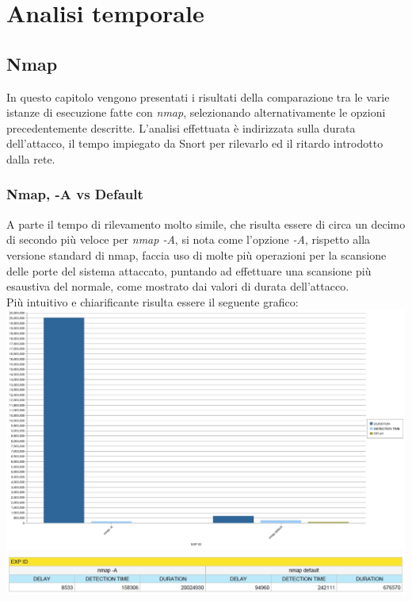 \chapter{Analisi temporale}

\section{Nmap}
In questo capitolo vengono presentati i risultati della comparazione tra le varie istanze di esecuzione fatte con \textit{nmap}, selezionando alternativamente le opzioni precedentemente descritte. L'analisi effettuata è indirizzata sulla durata dell'attacco, il tempo impiegato da Snort per rilevarlo ed il ritardo introdotto dalla rete.

\subsection{Nmap, -A vs Default}
A parte il tempo di rilevamento molto simile, che risulta essere di circa un decimo di secondo più veloce per \textit{nmap -A}, si nota come l'opzione \textit{-A}, rispetto alla versione standard di nmap, faccia uso di molte più operazioni per la scansione delle porte del sistema attaccato, puntando ad effettuare una scansione più esaustiva del normale, come mostrato dai valori di durata dell'attacco.\\
Più intuitivo e chiarificante risulta essere il seguente grafico:\\

\includegraphics[scale=0.3]{figure/tempi_nmap_A.jpg}\\

\includegraphics[scale=0.5]{figure/tabella_nmap_A.jpg}

